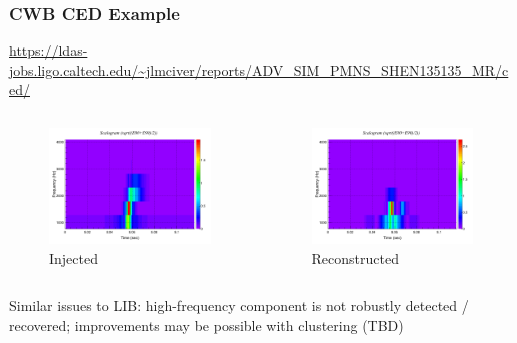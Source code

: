\documentclass{beamer}
\begin{document}
\begin{frame}
    \frametitle{CWB CED Example}
    {\tiny
    \url{https://ldas-jobs.ligo.caltech.edu/~jlmciver/reports/ADV_SIM_PMNS_SHEN135135_MR/ced/}}

    \begin{columns}[]
        \begin{center}
        \begin{figure}
            \vspace*{-0.5cm}
             \includegraphics[scale=0.2]{L1_wf_white_inj_tf.png} 
             \caption{Injected}
        \end{figure}
        \end{center}

        \begin{center}
        \begin{figure}
            \vspace*{-0.5cm}
             \includegraphics[scale=0.2]{L1_wf_white_rec_tf.png} 
             \caption{Reconstructed}
        \end{figure}
        \end{center}
    \end{columns}
    {\small Similar issues to LIB: high-frequency component is not robustly detected /
    recovered; improvements may be possible with clustering (TBD)}

\end{frame}
\end{document}
